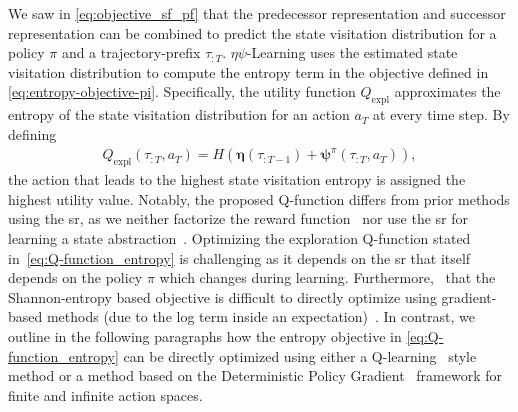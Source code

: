 \documentclass{article}
\theoremstyle{plain}
\theoremstyle{definition}
\theoremstyle{remark}
\newcommand{\alg}{$\eta$$\psi$-Learning}
\begin{document}
We saw in \autoref{eq:objective_sf_pf} that the predecessor representation and successor representation can be combined to predict the state visitation distribution for a policy $\pi$ and a trajectory-prefix $\tau_{:T}$. 
\alg{} uses the estimated state visitation distribution to compute the entropy term in the objective defined in \autoref{eq:entropy-objective-pi}.
Specifically, the utility function $Q_\text{expl}$ approximates the entropy of the state visitation distribution for an action $a_T$ at every time step.
By defining 
\begin{align}
    \label{eq:Q-function_entropy}
    Q_\text{expl}(\tau_{:T}, a_T) = H\left(\pmb{\eta} (\tau_{:T-1}) + \pmb{\psi}^{\pi} (\tau_{:T}, a_T)\right),
\end{align}
the action that leads to the highest state visitation entropy is assigned the highest utility value.
Notably, the proposed Q-function differs from prior methods using the \gls{sr}, as we neither factorize the reward function~\cite{barreto2017successor,barreto2018transfer,borsa2018universal,touati2021learning} nor use the \gls{sr} for learning a state abstraction~\cite{lehnert2020successor}. 
Optimizing the exploration Q-function stated in~\autoref{eq:Q-function_entropy} is challenging as it depends on the \gls{sr} that itself depends on the policy $\pi$ which changes during learning.
Furthermore,~\citet{guo2021geometric} that the Shannon-entropy based objective is difficult to directly optimize using gradient-based methods (due to the log term inside an expectation)~\citep{lee2019efficient,pong2019skew,guo2021geometric}. 
In contrast, we outline in the following paragraphs how the entropy objective in \autoref{eq:Q-function_entropy} can be directly optimized using either a Q-learning~\citep{watkins1992qlearning} style method or a method based on the Deterministic Policy Gradient~\cite{silver2014deterministic} framework for finite and infinite action spaces.
\end{document}
